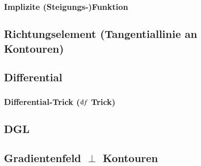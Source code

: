\subsubsection{Implizite (Steigungs-)Funktion}


\subsection{Richtungselement (Tangentiallinie an Kontouren)}


\subsection{Differential}


\subsubsection{Differential-Trick (\texorpdfstring{$\mathop{} \! \mathrm{d} f$}{df} Trick)}


\subsection{DGL}


\subsection{Gradientenfeld \texorpdfstring{$\perp$}{\_|\_} Kontouren}

